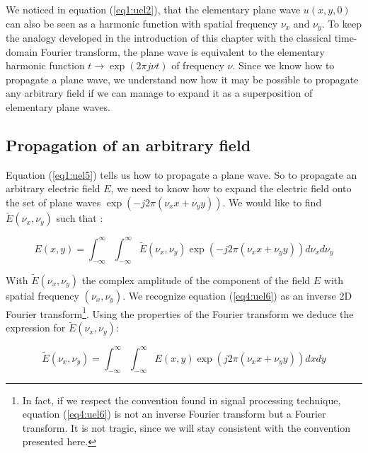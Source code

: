We noticed in equation (\ref{eq1:uel2}), that the elementary plane wave $u(x,y,0)$ can also be seen as a harmonic function with spatial frequency $\nu_x$ and $\nu_y$. To keep the analogy developed in the introduction of this chapter with the classical time-domain Fourier transform, the plane wave is equivalent to the elementary harmonic function $t\rightarrow \exp(2\pi j \nu t)$ of frequency $\nu$. Since we know how to propagate a plane wave, we understand now how it may be possible to propagate any arbitrary field if we can manage to expand it as a superposition of elementary plane waves.

\subsection{Propagation of an arbitrary field}

Equation (\ref{eq1:uel5}) tells us how to propagate a plane wave. So to propagate an arbitrary electric field $E$, we need to know how to expand the electric field onto the set of plane waves $\exp(-j 2 \pi (\nu_x x + \nu_y y))$. We would like to find $\widetilde{E}(\nu_x,\nu_y)$ such that :

\begin{equation}
 E(x,y) = \int_{-\infty}^{\infty} \int_{-\infty}^{\infty} \widetilde{E}(\nu_x,\nu_y) \exp(-j 2\pi (\nu_x x + \nu_y y)) d\nu_x d\nu_y
\label{eq4:uel6}
\end{equation}

With $\widetilde{E}(\nu_x,\nu_y)$ the complex amplitude of the component of the field $E$ with spatial frequency $(\nu_x,\nu_y)$. We recognize equation (\ref{eq4:uel6}) as an inverse 2D Fourier transform\footnote{In fact, if we respect the convention found in signal processing technique, equation (\ref{eq4:uel6}) is not an inverse Fourier transform but a Fourier transform\cite{Sig_proc}. It is not tragic, since we will stay consistent with the convention presented here.}. Using the properties of the Fourier transform\cite{Fourier_trans} we deduce the expression for $\widetilde{E}(\nu_x,\nu_y)$:

\begin{equation}
  \widetilde{E}(\nu_x,\nu_y) = \int_{-\infty}^{\infty} \int_{-\infty}^{\infty} E(x,y) \exp(j 2\pi (\nu_x x + \nu_y y)) dx dy
\label{eq4:uel7}
\end{equation}

